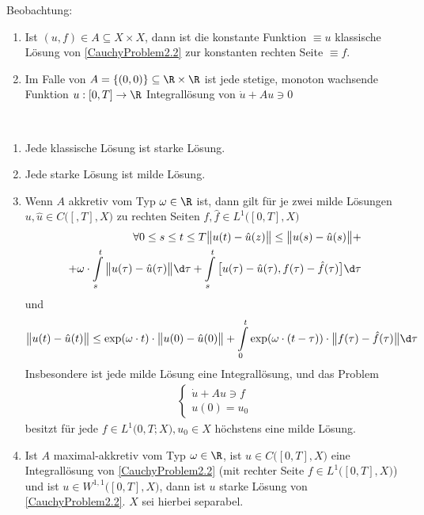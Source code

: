 Beobachtung:
\begin{enumerate}[label=(\alph*)]
\item Ist $(u,f)\in A\subseteq X\times X$, dann ist die konstante Funktion $\equiv u$ klassische Lösung von \eqref{CauchyProblem2.2} zur konstanten rechten Seite $\equiv f$.
\item Im Falle von $A=\lbrace(0,0)\rbrace\subseteq\R\times\R$ ist jede stetige, monoton wachsende Funktion $u:[0,T]\to\R$ %
Integrallösung von $\dot{u}+Au\ni 0$
\end{enumerate}

\begin{theorem}\
\begin{enumerate}[label=(\alph*)]
\item Jede klassische Lösung ist starke Lösung.
\item Jede starke Lösung ist milde Lösung.
\item Wenn $A$ akkretiv vom Typ $\omega\in\R$ ist, dann gilt für je zwei milde Lösungen $u,\hat{u}\in C\big([,T],X\big)$ zu rechten Seiten $f,\hat{f}\in L^1\big([0,T],X\big)$
\begin{align*}
\forall 0\leq s\leq t\leq T
\big\Vert u(t)-\hat{u}(z)\big\Vert\leq\big\Vert u(s)-\hat{u}(s)\big\Vert+\\+\omega\cdot\int\limits_s^t\big\Vert u(\tau)-\hat{u}(\tau)\big\Vert\d\tau+\int\limits_s^t\big[u(\tau)-\hat{u}(\tau),f(\tau)-\hat{f}(\tau)\big]\d\tau
\end{align*}
und 
\begin{align*}
\big\Vert u(t)-\hat{u}(t)\big\Vert\leq\exp(\omega\cdot t)\cdot\big\Vert u(0)-\hat{u}(0)\big\Vert+\int\limits_0^t\exp(\omega\cdot(t-\tau))\cdot\big\Vert f(\tau)-\hat{f}(\tau)\big\Vert\d\tau
\end{align*}
Insbesondere ist jede milde Lösung eine Integrallösung, und das Problem 
\begin{align*}
\left\lbrace\begin{array}{c}
\dot{u}+Au\ni f\\
u(0)=u_0
\end{array}\right.
\end{align*}
besitzt für jede $f\in L^1\big(0,T;X),u_0\in X$ höchstens eine milde Lösung.
\item Ist $A$ maximal-akkretiv vom Typ $\omega\in\R$, ist $u\in C\big([0,T],X)$ eine Integrallösung von \eqref{CauchyProblem2.2} (mit rechter Seite $f\in L^1\big([0,T],X\big)$) und ist $u\in W^{1,1}\big([0,T],X\big)$, dann ist $u$ starke Lösung von \eqref{CauchyProblem2.2}. $X$ sei hierbei separabel.
\end{enumerate}
\end{theorem}
